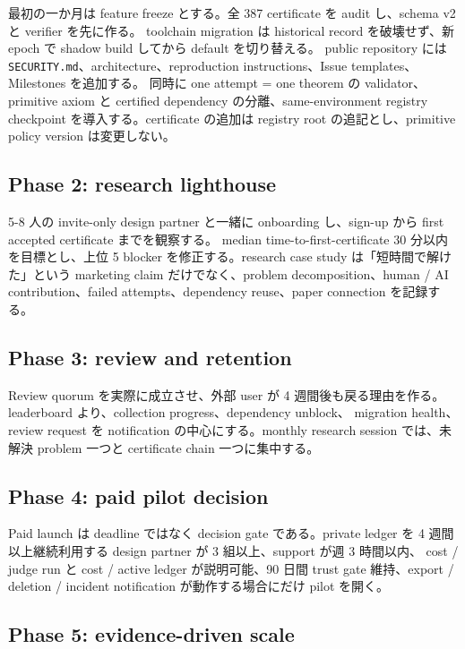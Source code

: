 \documentclass[a4paper,11pt]{ltjsarticle}
\begin{document}
最初の一か月は feature freeze とする。全 387 certificate を audit し、schema v2 と verifier を先に作る。
toolchain migration は historical record を破壊せず、新 epoch で shadow build してから default を切り替える。
public repository には \texttt{SECURITY.md}、architecture、reproduction instructions、Issue templates、Milestones を追加する。
同時に one attempt = one theorem の validator、primitive axiom と certified dependency の分離、same-environment
registry checkpoint を導入する。certificate の追加は registry root の追記とし、primitive policy version は変更しない。

\subsection{Phase 2: research lighthouse}

5-8 人の invite-only design partner と一緒に onboarding し、sign-up から first accepted certificate までを観察する。
median time-to-first-certificate 30 分以内を目標とし、上位 5 blocker を修正する。research case study は「短時間で解けた」という
marketing claim だけでなく、problem decomposition、human / AI contribution、failed attempts、dependency reuse、paper connection を記録する。

\subsection{Phase 3: review and retention}

Review quorum を実際に成立させ、外部 user が 4 週間後も戻る理由を作る。leaderboard より、collection progress、dependency unblock、
migration health、review request を notification の中心にする。monthly research session では、未解決 problem 一つと certificate chain 一つに集中する。

\subsection{Phase 4: paid pilot decision}

Paid launch は deadline ではなく decision gate である。private ledger を 4 週間以上継続利用する design partner が 3 組以上、support が週 3 時間以内、
cost / judge run と cost / active ledger が説明可能、90 日間 trust gate 維持、export / deletion / incident notification が動作する場合にだけ pilot を開く。

\subsection{Phase 5: evidence-driven scale}
\end{document}
